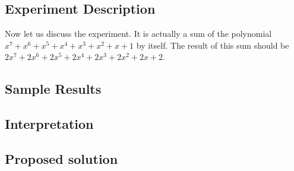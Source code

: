 \subsection{Experiment Description}
\par
Now let us discuss the experiment. It is actually a sum of the
polynomial $x^7+x^6+x^5+x^4+x^3+x^2+x+1$ by itself. The result of this
sum should be $2x^7+2x^6+2x^5+2x^4+2x^3+2x^2+2x+2$. 
\par
\subsection{Sample Results}
\par
\par
\subsection{Interpretation}
\par
\par
\subsection{Proposed solution}
\par
\par
